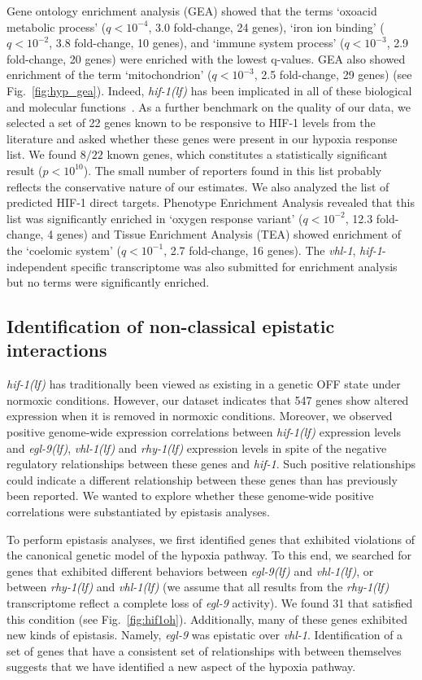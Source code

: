 \documentclass[9pt,twocolumn,twoside]{pnas-new}
\newcommand{\qval}[1]{$q<10^{-#1}$}
\newcommand{\gene}[1]{\emph{#1}}
\newcommand{\egl}{\emph{egl-9(lf)}}
\newcommand{\rhy}{\emph{rhy-1(lf)}}
\newcommand{\vhl}{\emph{vhl-1(lf)}}
\newcommand{\hif}{\emph{hif-1(lf)}}
\newcommand{\hifp}{HIF-1}
\newcommand{\hifn}{547}
\newcommand{\hifohtargets}{31}
\begin{document}
Gene ontology enrichment analysis (GEA) showed that the terms `oxoacid metabolic process'
(\qval{4}, 3.0 fold-change, 24 genes),
`iron ion binding' (\qval{2}, 3.8 fold-change, 10 genes),
and `immune system process' (\qval{3}, 2.9 fold-change, 20 genes) were enriched
with the lowest q-values. GEA also showed enrichment of the term
`mitochondrion' (\qval{3}, 2.5 fold-change, 29 genes) (see
Fig.~\ref{fig:hyp_gea}). Indeed, \hif{} has been implicated in
all of these biological and molecular functions~\cite{Luhachack2012,Ackerman2012,
Romney2011,Semenza2011}. As a further benchmark on the quality of our data,
we selected a set of 22 genes known to be responsive to \hifp{} levels from the literature
and asked whether these genes were present in our hypoxia response list. We found $8/22$ known
genes, which constitutes a statistically significant result ($p<10^{10}$).
The small number of reporters found in this list probably reflects the conservative
nature of our estimates. We also analyzed the list of predicted \hifp{} direct targets.
Phenotype Enrichment Analysis revealed that this list was significantly enriched in
`oxygen response variant' (\qval{2}, 12.3 fold-change, 4 genes) and Tissue Enrichment
Analysis (TEA) showed enrichment of the `coelomic system' (\qval{1}, 2.7 fold-change,
16 genes). The \gene{vhl-1}, \gene{hif-1}-independent specific transcriptome was also submitted
for enrichment analysis but no terms were significantly enriched.

\subsection{Identification of non-classical epistatic interactions}
\label{sub:hifoh}
\hif{} has traditionally been viewed as existing in a genetic OFF state under
normoxic conditions. However, our dataset indicates that \hifn{} genes show
altered expression when it is removed in normoxic conditions. Moreover, we
observed positive genome-wide expression correlations between \hif{} expression
levels and \egl{}, \vhl{} and \rhy{} expression levels in spite of the negative
regulatory relationships between these genes and \gene{hif-1}. Such positive
relationships could indicate a different relationship between these genes
than has previously been reported. We wanted to explore whether these genome-wide
positive correlations were substantiated by epistasis analyses.

To perform epistasis analyses, we first identified genes that exhibited violations
of the canonical genetic model of the hypoxia pathway. To this end, we searched for
genes that exhibited different behaviors between \egl{} and \vhl{}, or
between \rhy{} and \vhl{} (we assume that all results from the
\rhy{} transcriptome reflect a complete loss of \gene{egl-9} activity). We found
\hifohtargets{} that satisfied this condition (see Fig.~\ref{fig:hif1oh}).
Additionally, many of these genes exhibited new kinds of epistasis. Namely,
\gene{egl-9} was epistatic over \gene{vhl-1}. Identification of a set of genes
that have a consistent set of relationships with between themselves suggests that
we have identified a new aspect of the hypoxia pathway.
\end{document}

